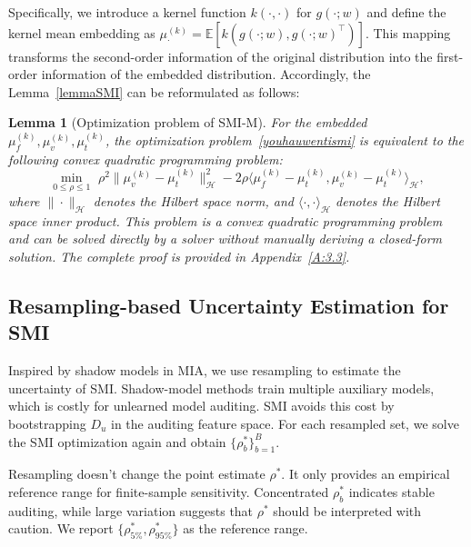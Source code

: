 \documentclass{article}
\theoremstyle{plain}
\newtheorem{lemma}[theorem]{Lemma}
\theoremstyle{definition}
\theoremstyle{remark}
\begin{document}
Specifically, we introduce a kernel function $k(\cdot, \cdot)$ for $g(\cdot;w)$ and define the kernel mean embedding as $\mu^{(k)}_\cdot=\mathbb E[k(g(\cdot;w),g(\cdot;w)^\top)]$. This mapping transforms the second-order information of the original distribution into the first-order information of the embedded distribution. Accordingly, the Lemma~\ref{lemmaSMI} can be reformulated as follows:
\begin{lemma}[Optimization problem of SMI-M]
    For the embedded $\mu^{(k)}_f, \mu^{(k)}_v, \mu^{(k)}_t$, the optimization problem~\eqref{youhauwentismi} is equivalent to the following convex quadratic programming problem:
    \begin{equation}
        \min_{0\le\rho\le 1}\,\, \rho^2\|\mu^{(k)}_v-\mu^{(k)}_t \|^2_\mathcal H-2\rho\langle\mu_f^{(k)}-\mu_t^{(k)}, \mu_v^{(k)}-\mu_t^{(k)}\rangle_\mathcal H,\label{youhuamd}
    \end{equation}
where  $\|\cdot\|_\mathcal H$ denotes the Hilbert space norm, and $\langle\cdot,\cdot \rangle_{\mathcal H}$ denotes the Hilbert space inner product. This problem is a convex quadratic programming problem and can be solved directly by a solver without manually deriving a closed-form solution. The complete proof is provided in Appendix~\ref{A:3.3}.
\end{lemma}
\subsection{Resampling-based Uncertainty Estimation for SMI}
Inspired by shadow models in MIA, we use resampling to estimate the uncertainty of SMI. Shadow-model methods train multiple auxiliary models, which is costly for unlearned model auditing. SMI avoids this cost by bootstrapping $D_u$ in the auditing feature space. For each resampled set, we solve the SMI optimization again and obtain $\{\rho_b^*\}_{b=1}^{B}$.

Resampling doesn't change the point estimate $\rho^*$. It only provides an empirical reference range for finite-sample sensitivity. Concentrated $\rho_b^*$ indicates stable auditing, while large variation suggests that $\rho^*$ should be interpreted with caution. We report $\{\rho^*_{5\%},\rho^*_{95\%}\}$ as the reference range.
\end{document}

